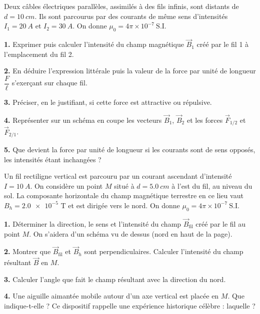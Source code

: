 \documentclass[11pt]{article}
\begin{document}
\begin{exercice}
Deux câbles électriques parallèles, assimilés à des fils infinis, sont distants de $d = \SI{10}{cm}$. Ils sont parcourus par des courants de même sens d'intensités $I_1 = \SI{20}{A}$ et $I_2 = \SI{30}{A}$. On donne $\mu_0 = 4\pi \times 10^{-7}\ \mathrm{S.I.}$

\textbf{1.} Exprimer puis calculer l'intensité du champ magnétique $\vec{B}_1$ créé par le fil 1 à l'emplacement du fil 2.

\textbf{2.} En déduire l'expression littérale puis la valeur de la force par unité de longueur $\dfrac{F}{\ell}$ s'exerçant sur chaque fil.

\textbf{3.} Préciser, en le justifiant, si cette force est attractive ou répulsive.

\textbf{4.} Représenter sur un schéma en coupe les vecteurs $\vec{B}_1$, $\vec{B}_2$ et les forces $\vec{F}_{1/2}$ et $\vec{F}_{2/1}$.

\textbf{5.} Que devient la force par unité de longueur si les courants sont de sens opposés, les intensités étant inchangées ?
\end{exercice}

\begin{exercice}
Un fil rectiligne vertical est parcouru par un courant ascendant d'intensité $I = \SI{10}{A}$. On considère un point $M$ situé à $d = \SI{5,0}{cm}$ à l'est du fil, au niveau du sol. La composante horizontale du champ magnétique terrestre en ce lieu vaut $B_h = \num{2,0e-5}$ T et est dirigée vers le nord. On donne $\mu_0 = 4\pi \times 10^{-7}\ \mathrm{S.I.}$

\textbf{1.} Déterminer la direction, le sens et l'intensité du champ $\vec{B}_{\text{fil}}$ créé par le fil au point $M$. On s'aidera d'un schéma vu de dessus (nord en haut de la page).

\textbf{2.} Montrer que $\vec{B}_{\text{fil}}$ et $\vec{B}_h$ sont perpendiculaires. Calculer l'intensité du champ résultant $\vec{B}$ en $M$.

\textbf{3.} Calculer l'angle que fait le champ résultant avec la direction du nord.

\textbf{4.} Une aiguille aimantée mobile autour d'un axe vertical est placée en $M$. Que indique-t-elle ? Ce dispositif rappelle une expérience historique célèbre : laquelle ?
\end{exercice}
\end{document}
